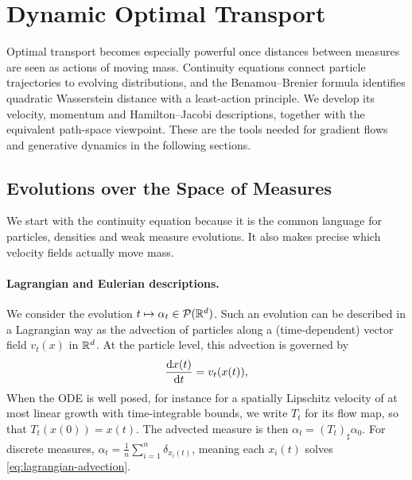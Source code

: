 
\section{Dynamic Optimal Transport}
\label{sec-dynamic-optimal-transport}

Optimal transport becomes especially powerful once distances between measures are seen as actions of moving mass. Continuity equations connect particle trajectories to evolving distributions, and the Benamou--Brenier formula identifies quadratic Wasserstein distance with a least-action principle. We develop its velocity, momentum and Hamilton--Jacobi descriptions, together with the equivalent path-space viewpoint. These are the tools needed for gradient flows and generative dynamics in the following sections.

\subsection{Evolutions over the Space of Measures}

We start with the continuity equation because it is the common language for particles, densities and weak measure evolutions. It also makes precise which velocity fields actually move mass.

\paragraph{Lagrangian and Eulerian descriptions.}

We consider the evolution $t \mapsto \alpha_t \in \mathcal{P}(\mathbb{R}^d)$. Such an evolution can be described in a Lagrangian way as the advection of particles along a (time-dependent) vector field $v_t(x)$ in $\mathbb{R}^d$. At the particle level, this advection is governed by
\begin{equation}
    \frac{\mathrm{d} x(t)}{\mathrm{d} t} = v_t(x(t)), \label{eq:lagrangian-advection}
\end{equation}
When the ODE is well posed, for instance for a spatially Lipschitz velocity of at most linear growth with time-integrable bounds, we write $T_t$ for its flow map, so that $T_t(x(0))=x(t)$. The advected measure is then $\alpha_t = (T_t)_\sharp \alpha_0$. For discrete measures, $\alpha_t = \frac{1}{n} \sum_{i=1}^n \delta_{x_i(t)}$, meaning each $x_i(t)$ solves \eqref{eq:lagrangian-advection}.

